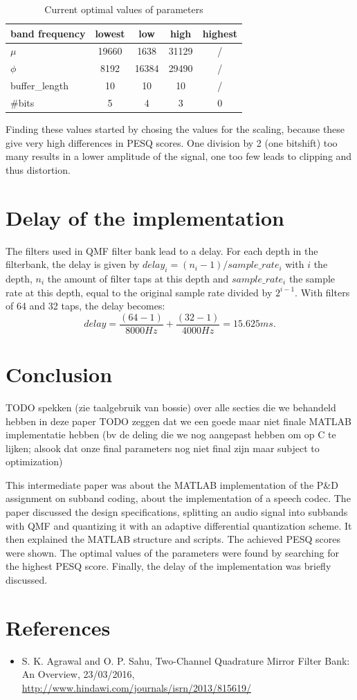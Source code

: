 \documentclass[a4paper]{article}
\begin{document}
\begin{table}
\begin{tabular}{l|cccc} 
band frequency & lowest & low & high & highest \\ 
\hline 
$\mu$ & 19660 & 1638 & 31129 & / \\  
$\phi$ & 8192 & 16384 & 29490 & / \\  
buffer\_length & 10 & 10 & 10 & / \\  
\#bits & 5 & 4 & 3 & 0 \\ 
\hline 
\end{tabular}
\caption{Current optimal values of parameters}
\label{tab:parametervalues}
\end{table}
Finding these values started by chosing the values for the scaling, because these give very high differences in PESQ scores. One division by 2 (one bitshift) too many results in a lower amplitude of the signal, one too few leads to clipping and thus distortion. 

\section{Delay of the implementation}
The filters used in QMF filter bank lead to a delay. For each depth in the filterbank, the delay is given by $delay_i = (n_i-1) / sample\_rate_i$ with $i$ the depth, $n_i$ the amount of filter taps at this depth and $sample\_rate_i$ the sample rate at this depth, equal to the original sample rate divided by $2^{i-1}$. With filters of 64 and 32 taps, the delay becomes:
\begin{equation*}
delay = \frac{(64-1)}{8000 Hz} + \frac{(32-1)}{4000 Hz} = 15.625 ms.
\end{equation*}

\section{Conclusion}
TODO spekken (zie taalgebruik van bossie) over alle secties die we behandeld hebben in deze paper
TODO zeggen dat we een goede maar niet finale MATLAB implementatie hebben (bv de deling die we nog aangepast hebben om op C te lijken; alsook dat onze final parameters nog niet final zijn maar subject to optimization)

This intermediate paper was about the MATLAB implementation of the P\&D assignment on subband coding, about the implementation of a speech codec. The paper discussed the design specifications, splitting an audio signal into subbands with QMF and quantizing it with an adaptive differential quantization scheme. It then explained the MATLAB structure and scripts. The achieved PESQ scores were shown. The optimal values of the parameters were found by searching for the highest PESQ score. Finally, the delay of the implementation was briefly discussed.

\section{References}
\begin{itemize}
\item S. K. Agrawal and O. P. Sahu, Two-Channel Quadrature Mirror Filter Bank: An Overview, 23/03/2016, \url{http://www.hindawi.com/journals/isrn/2013/815619/}
\end{itemize}
\end{document}
